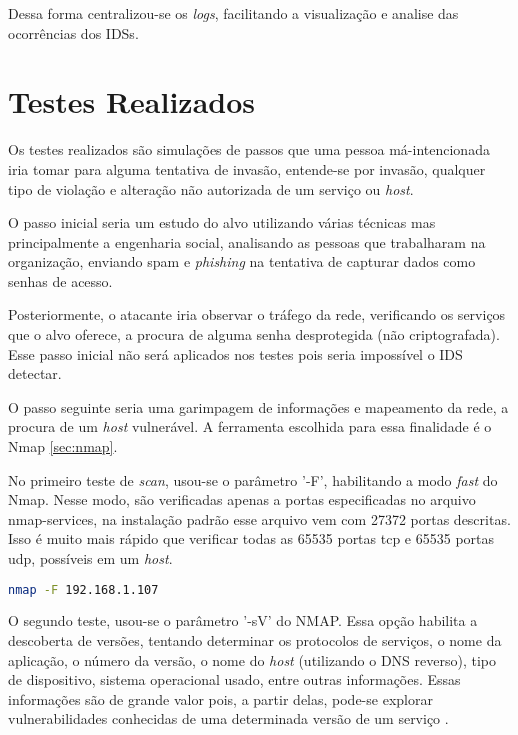 Dessa forma centralizou-se os \textit{logs}, facilitando a visualização e analise das ocorrências dos IDSs. 

\section{Testes Realizados} \label{sec:testes}
Os testes realizados são simulações de passos que uma pessoa má-intencionada iria tomar para alguma tentativa de invasão, entende-se por invasão, qualquer tipo de violação e alteração não autorizada de um serviço ou \textit{host}.

O passo inicial seria um estudo do alvo utilizando várias técnicas mas principalmente a engenharia social, analisando as pessoas que trabalharam na organização, enviando spam e \textit{phishing} na tentativa de capturar dados como senhas de acesso. 

Posteriormente, o atacante iria observar o tráfego da rede, verificando os serviços que o alvo oferece, a procura de alguma senha desprotegida (não criptografada). Esse passo inicial não será aplicados nos testes pois seria impossível o IDS detectar.

O passo seguinte seria uma garimpagem de informações e mapeamento da rede, a procura de um \textit{host} vulnerável. A ferramenta escolhida para essa finalidade é o Nmap \autoref{sec:nmap}. 

No primeiro teste de \textit{scan}, usou-se o parâmetro '-F', habilitando a modo \textit{fast} do Nmap. Nesse modo, são verificadas apenas a portas especificadas no arquivo nmap-services, na instalação padrão esse arquivo vem com 27372 portas descritas. Isso é muito mais rápido que verificar todas as 65535 portas tcp e 65535 portas udp, possíveis em um \textit{host}.

\begin{lstlisting}[language=bash, frame=single]
    nmap -F 192.168.1.107
\end{lstlisting}

O segundo teste, usou-se o parâmetro '-sV' do NMAP. Essa opção habilita a descoberta de versões, tentando determinar os protocolos de serviços, o nome da aplicação, o número da versão, o nome do \textit{host} (utilizando o DNS reverso), tipo de dispositivo, sistema operacional usado, entre outras informações. Essas informações são de grande valor pois, a partir delas, pode-se explorar vulnerabilidades conhecidas de uma determinada versão de um serviço \cite{nmap}.

